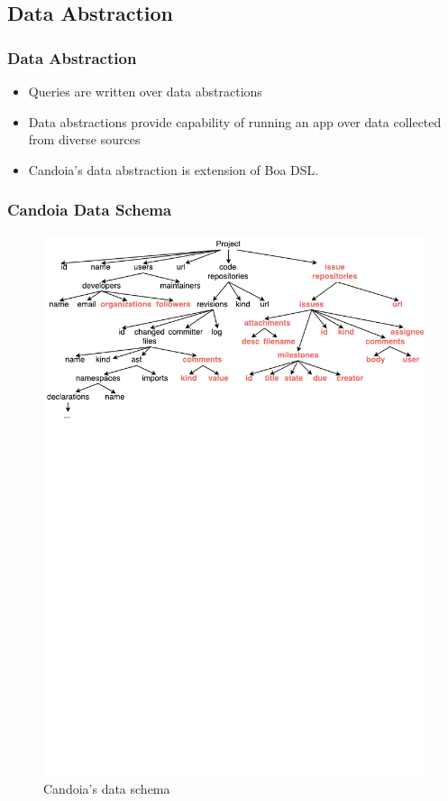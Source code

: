      \subsection{Data Abstraction}
        \begin{frame}
        \frametitle{Data Abstraction}
            \begin{itemize}
                \item Queries are written over data abstractions
               \item Data abstractions provide capability of running an app over data collected
               from diverse sources
               \item Candoia's data abstraction is extension of Boa DSL.
            \end{itemize}
        \end{frame}


        \begin{frame}
        \frametitle{Candoia Data Schema}
                \begin{figure}
                    \centering
                    \includegraphics[scale=0.45]{figures/data-schema.pdf}
                    \caption{Candoia's data schema}
                \end{figure}
        \end{frame}

